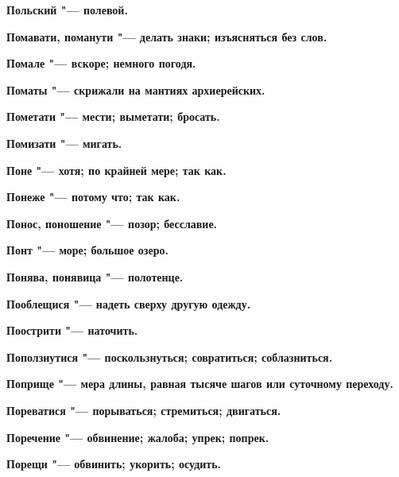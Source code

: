 \begin{multicols}{2}
\bfseries Польский\normalfont{} "--- полевой. 




\bfseries Помавати, поманути\normalfont{} "--- делать знаки; изъясняться без слов. 




\bfseries Помале\normalfont{} "--- вскоре; немного погодя. 




\bfseries Поматы\normalfont{} "--- скрижали на мантиях архиерейских. 




\bfseries Пометати\normalfont{} "--- мести; выметати; бросать. 




\bfseries Помизати\normalfont{} "--- мигать. 




\bfseries Поне\normalfont{} "--- хотя; по крайней мере; так как. 




\bfseries Понеже\normalfont{} "--- потому что; так как. 




\bfseries Понос, поношение\normalfont{} "--- позор; бесславие. 




\bfseries Понт\normalfont{} "--- море; большое озеро. 




\bfseries Понява, понявица\normalfont{} "--- полотенце. 




\bfseries Пооблещися\normalfont{} "--- надеть сверху другую одежду. 




\bfseries Поострити\normalfont{} "--- наточить. 




\bfseries Поползнутися\normalfont{} "--- поскользнуться; совратиться; соблазниться. 




\bfseries Поприще\normalfont{} "--- мера длины, равная тысяче шагов или суточному переходу. 




\bfseries Пореватися\normalfont{} "--- порываться; стремиться; двигаться. 




\bfseries Поречение\normalfont{} "--- обвинение; жалоба; упрек; попрек. 




\bfseries Порещи\normalfont{} "--- обвинить; укорить; осудить. 





\end{multicols}
